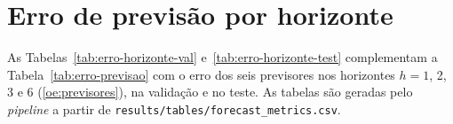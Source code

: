 \chapter{Erro de previsão por horizonte}
\label{ap:erro-horizonte}

As Tabelas~\ref{tab:erro-horizonte-val} e~\ref{tab:erro-horizonte-test} complementam a Tabela~\ref{tab:erro-previsao} com o erro dos seis previsores nos horizontes $h = 1$, 2, 3 e 6 (\ref{oe:previsores}), na validação e no teste. As tabelas são geradas pelo \textit{pipeline} a partir de \texttt{results/tables/forecast\_metrics.csv}.


